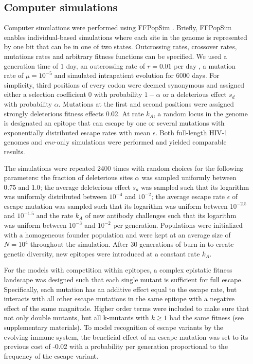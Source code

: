 \documentclass[11pt]{article}
\newcommand{\env}{\textit{env}}
\begin{document}
\subsection*{Computer simulations}
Computer simulations were performed using FFPopSim
\citep{zanini_ffpopsim:_2012}. Briefly, FFPopSim enables individual-based
simulations where each site in the genome is represented by one bit that can be
in one of two states. Outcrossing rates, crossover rates, mutations rates and
arbitrary fitness functions can be specified. We used a generation time of 1
day, an outcrossing rate of $r=0.01$ per day \citep{batorsky_estimate_2011,
neher_recombination_2010}, a mutation rate of $\mu=10^{-5}$
\citep{mansky_lower_1995, abram_nature_2010} and simulated intrapatient
evolution for 6000 days. For simplicity, third positions of every codon were
deemed synonymous and assigned either a selection coefficient $0$ with
probability $1-\alpha$ or a deleterious effect $s_d$ with probability $\alpha$.
Mutations at the first and second positions were assigned strongly deleterious 
fitness effects 0.02. At 
rate $k_A$, a random locus in the genome is designated an epitope that can
escape by one or several mutations with exponentially distributed escape rates
with mean $\epsilon$. Both full-length HIV-1 genomes and \env{}-only simulations
were performed and yielded comparable results.

The simulations were repeated 2400 times with random choices for the following
parameters: the fraction of deleterious sites $\alpha$ was sampled uniformly
between 0.75 and 1.0; the average deleterious effect $s_d$ was sampled such that
its logarithm was uniformly distributed  between $10^{-4}$ and $10^{-2}$; the
average escape rate $\epsilon$ of escape mutation was sampled such that its logarithm was
uniform between $10^{-2.5}$ and $10^{-1.5}$ and the rate $k_A$ of new antibody
challenges such that its logarithm was uniform between $10^{-3}$ and $10^{-2}$
per generation. Populations were initialized with a homogeneous founder
population and were kept at an average size of $N=10^4$ throughout the
simulation. After 30 generations of burn-in to create genetic diversity, new
epitopes were introduced at a constant rate $k_A$. 

For the models with competition within epitopes, a complex epistatic fitness
landscape was designed such that each single mutant is sufficient for full
escape. Specifically, each mutation has an additive effect equal to the
escape rate, but interacts with all other escape mutations in the same
epitope with a negative effect of the same magnitude. 
Higher order terms were included to make sure that not
only double mutants, but all k-mutants with $k \geq 1$ had the same fitness (see
supplementary materials). To model recognition of escape variants by the
evolving immune system, the beneficial effect of an escape mutation was set
to its previous cost of -0.02 with a probability per generation proportional to
the frequency of the escape variant.
\end{document}
